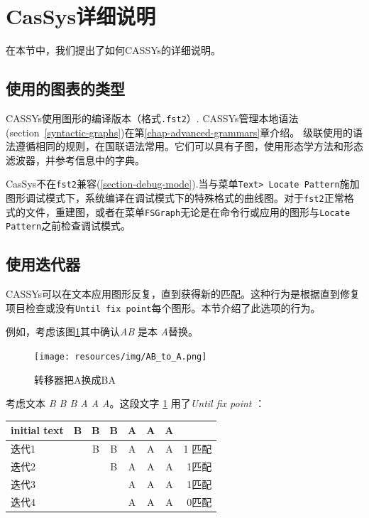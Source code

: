 \section{CasSys详细说明}

在本节中，我们提出了如何CASSYs的详细说明。

\subsection{使用的图表的类型}
\label{graphs-for-cassys}

CASSYs使用图形的编译版本（格式\verb+.fst2+）. CASSYs管理本地语法(section~\ref{syntactic-graphs})在第\ref{chap-advanced-grammars}章介绍。
级联使用的语法遵循相同的规则，在国联语法常用。它们可以具有子图，使用形态学方法和形态滤波器，并参考信息中的字典。

\bigskip
\noindent CasSys不在\verb+fst2+兼容(\ref{section-debug-mode}).当与菜单\verb+Text> Locate Pattern+施加图形调试模式下，系统编译在调试模式下的特殊格式的曲线图。对于\verb+fst2+正常格式的文件，重建图，或者在菜单\verb+FSGraph+无论是在命令行或应用的图形与\verb+Locate Pattern+之前检查调试模式。

\subsection{使用迭代器}
\label{sub:AppWhiCon}

CASSYs可以在文本应用图形反复，直到获得新的匹配。这种行为是根据直到修复项目检查或没有\verb+Until fix point+每个图形。本节介绍了此选项的行为。

例如，考虑该图\ref{fig:AB->A}其中确认\emph{AB} 是本 \emph{A}替换。

\begin{figure}[!htbp]
  \centering
  \texttt{[image: resources/img/AB\_to\_A.png]}
  \caption{转移器把A换成BA}
  \label{fig:AB->A}
\end{figure}

考虑文本 \emph{B B B A A A}。这段文字 \ref{fig:AB->A} 用了\emph{Until fix point}  ： \\

\begin{tabular}{|l|cccccc|r|}
\hline
initial text  &B&B&B&A&A&A&\\
\hline
迭代1 & &B&B&A&A&A& 1 匹配\\
迭代2 & & &B&A&A&A& 1匹配\\
迭代3 & & & &A&A&A& 1匹配\\
迭代4 & & & &A&A&A& 0匹配\\
\hline
\end{tabular}

